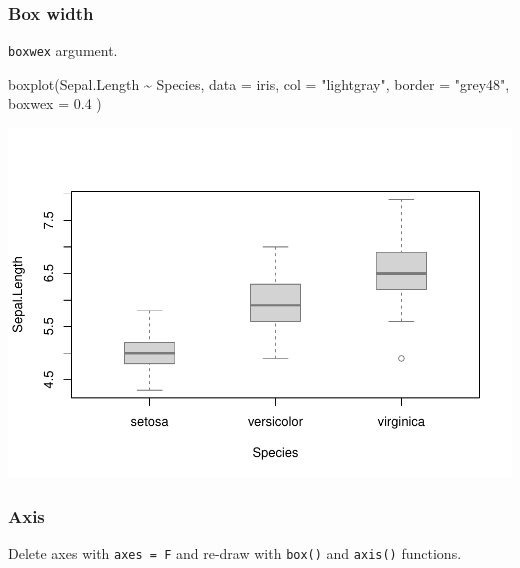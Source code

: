 \documentclass[
]{article}
\newenvironment{Shaded}{\begin{snugshade}}{\end{snugshade}}
\newcommand{\AttributeTok}[1]{\textcolor[rgb]{0.77,0.63,0.00}{#1}}
\newcommand{\FloatTok}[1]{\textcolor[rgb]{0.00,0.00,0.81}{#1}}
\newcommand{\FunctionTok}[1]{\textcolor[rgb]{0.00,0.00,0.00}{#1}}
\newcommand{\NormalTok}[1]{#1}
\newcommand{\SpecialCharTok}[1]{\textcolor[rgb]{0.00,0.00,0.00}{#1}}
\newcommand{\StringTok}[1]{\textcolor[rgb]{0.31,0.60,0.02}{#1}}
\begin{document}
\hypertarget{box-width}{%
\subsubsection{Box width}\label{box-width}}

\texttt{boxwex} argument.

\begin{Shaded}
\begin{Highlighting}[]
\FunctionTok{boxplot}\NormalTok{(Sepal.Length }\SpecialCharTok{\textasciitilde{}}\NormalTok{ Species, }\AttributeTok{data =}\NormalTok{ iris,}
        \AttributeTok{col =} \StringTok{"lightgray"}\NormalTok{, }\AttributeTok{border =} \StringTok{"grey48"}\NormalTok{,}
        \AttributeTok{boxwex =} \FloatTok{0.4}\NormalTok{ )}
\end{Highlighting}
\end{Shaded}

\begin{center}\includegraphics{biostats_files/figure-latex/unnamed-chunk-133-1} \end{center}

\hypertarget{axis-1}{%
\subsubsection{Axis}\label{axis-1}}

Delete axes with \texttt{axes\ =\ F} and re-draw with \texttt{box()} and \texttt{axis()} functions.
\end{document}
